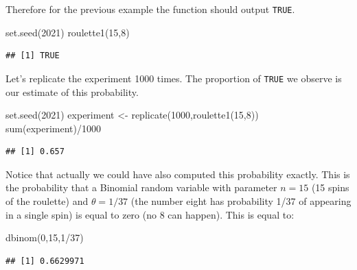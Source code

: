 \documentclass[
]{book}
\newenvironment{Shaded}{\begin{snugshade}}{\end{snugshade}}
\newcommand{\DecValTok}[1]{\textcolor[rgb]{0.00,0.00,0.81}{#1}}
\newcommand{\FunctionTok}[1]{\textcolor[rgb]{0.00,0.00,0.00}{#1}}
\newcommand{\NormalTok}[1]{#1}
\newcommand{\OtherTok}[1]{\textcolor[rgb]{0.56,0.35,0.01}{#1}}
\newcommand{\SpecialCharTok}[1]{\textcolor[rgb]{0.00,0.00,0.00}{#1}}
\begin{document}
Therefore for the previous example the function should output \texttt{TRUE}.

\begin{Shaded}
\begin{Highlighting}[]
\FunctionTok{set.seed}\NormalTok{(}\DecValTok{2021}\NormalTok{)}
\FunctionTok{roulette1}\NormalTok{(}\DecValTok{15}\NormalTok{,}\DecValTok{8}\NormalTok{)}
\end{Highlighting}
\end{Shaded}

\begin{verbatim}
## [1] TRUE
\end{verbatim}

Let's replicate the experiment 1000 times. The proportion of \texttt{TRUE} we observe is our estimate of this probability.

\begin{Shaded}
\begin{Highlighting}[]
\FunctionTok{set.seed}\NormalTok{(}\DecValTok{2021}\NormalTok{)}
\NormalTok{experiment }\OtherTok{\textless{}{-}} \FunctionTok{replicate}\NormalTok{(}\DecValTok{1000}\NormalTok{,}\FunctionTok{roulette1}\NormalTok{(}\DecValTok{15}\NormalTok{,}\DecValTok{8}\NormalTok{))}
\FunctionTok{sum}\NormalTok{(experiment)}\SpecialCharTok{/}\DecValTok{1000}
\end{Highlighting}
\end{Shaded}

\begin{verbatim}
## [1] 0.657
\end{verbatim}

Notice that actually we could have also computed this probability exactly. This is the probability that a Binomial random variable with parameter \(n=15\) (15 spins of the roulette) and \(\theta = 1/37\) (the number eight has probability 1/37 of appearing in a single spin) is equal to zero (no 8 can happen). This is equal to:

\begin{Shaded}
\begin{Highlighting}[]
\FunctionTok{dbinom}\NormalTok{(}\DecValTok{0}\NormalTok{,}\DecValTok{15}\NormalTok{,}\DecValTok{1}\SpecialCharTok{/}\DecValTok{37}\NormalTok{)}
\end{Highlighting}
\end{Shaded}

\begin{verbatim}
## [1] 0.6629971
\end{verbatim}
\end{document}
